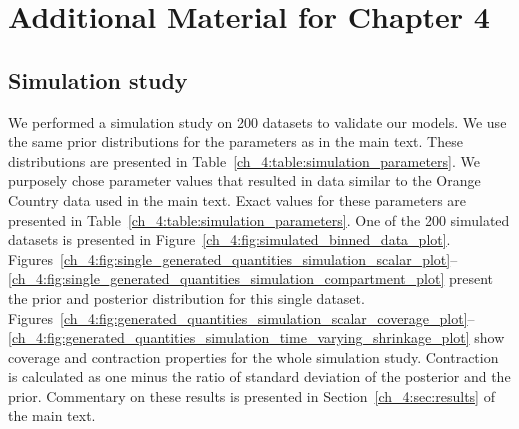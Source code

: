 \chapter{Additional Material for Chapter 4}
\graphicspath{{figures/ch_4/}}

\section{Simulation study}

We performed a simulation study on 200 datasets to validate our models.
We use the same prior distributions for the parameters as in the main text.
These distributions are presented in Table~\ref{ch_4:table:simulation_parameters}.
We purposely chose parameter values that resulted in data similar to the Orange Country data used in the main text.
Exact values for these parameters are presented in Table~\ref{ch_4:table:simulation_parameters}.
One of the 200 simulated datasets is presented in Figure~\ref{ch_4:fig:simulated_binned_data_plot}.
Figures~\ref{ch_4:fig:single_generated_quantities_simulation_scalar_plot}--\ref{ch_4:fig:single_generated_quantities_simulation_compartment_plot} present the prior and posterior distribution for this single dataset.
Figures~\ref{ch_4:fig:generated_quantities_simulation_scalar_coverage_plot}--\ref{ch_4:fig:generated_quantities_simulation_time_varying_shrinkage_plot} show coverage and contraction properties for the whole simulation study.
Contraction is calculated as one minus the ratio of standard deviation of the posterior and the prior.
Commentary on these results is presented in Section~\ref{ch_4:sec:results} of the main text.


